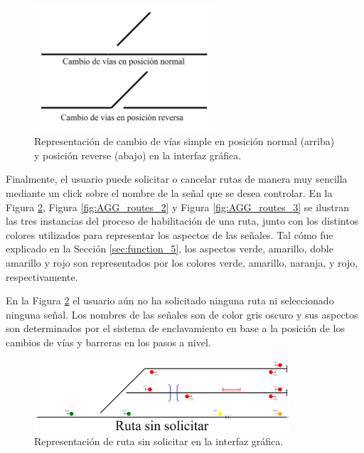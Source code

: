 	\begin{figure}[H]
		\centering
		\includegraphics[width=0.6\textwidth]{AGG/images/AGG_switch}
		\centering\caption{Representación de cambio de vías simple en posición normal (arriba) y posición reverse (abajo) en la interfaz gráfica.}
		\label{fig:AGG_switch}
	\end{figure}

	Finalmente, el usuario puede solicitar o cancelar rutas de manera muy sencilla mediante un click sobre el nombre de la señal que se desea controlar. En la Figura \ref{fig:AGG_routes_1}, Figura \ref{fig:AGG_routes_2} y Figura \ref{fig:AGG_routes_3} se ilustran las tres instancias del proceso de habilitación de una ruta, junto con los distintos colores utilizados para representar los aspectos de las señales. Tal cómo fue explicado en la Sección \ref{sec:function_5}, los aspectos verde, amarillo, doble amarillo y rojo son representados por los colores verde, amarillo, naranja, y rojo, respectivamente.
	
	En la Figura \ref{fig:AGG_routes_1} el usuario aún no ha solicitado ninguna ruta ni seleccionado ninguna señal. Los nombres de las señales son de color gris oscuro y sus aspectos son determinados por el sistema de enclavamiento en base a la posición de los cambios de vías y barreras en los pasos a nivel.	
	
	\begin{figure}[H]
		\centering
		\includegraphics[width=0.85\textwidth]{AGG/images/AGG_routes_1}
		\centering\caption{Representación de ruta sin solicitar en la interfaz gráfica.}
		\label{fig:AGG_routes_1}
	\end{figure}
	
